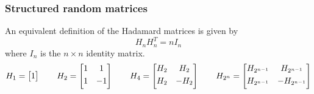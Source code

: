 \begin{frame}[t]
	\frametitle{Structured random matrices}
	An equivalent definition of the Hadamard matrices is given by 
	$$H_{n}H_{n}^T=nI_{n} $$
	where $I_{n}$ is the $n \times n$ identity matrix.
$$
	H_{1} = \begin{bmatrix}
		1
		\end{bmatrix}
\qquad
H_{2} = \begin{bmatrix}
1 & 1           \\[0.3em]
1& -1\\[0.3em]
\end{bmatrix}	
\qquad
H_{4} = \begin{bmatrix}
H_{2} & H_{2}           \\[0.3em]
H_{2}& -H_{2}\\[0.3em]
\end{bmatrix}	
\\
\centering
\qquad
H_{2^n} = \begin{bmatrix}
H_{2^{n-1}} & H_{2^{n-1}}           \\[0.3em]
H_{2^{n-1}}& -H_{2^{n-1}}            \\[0.3em]
\end{bmatrix}	


$$
	
	
\end{frame}




        
